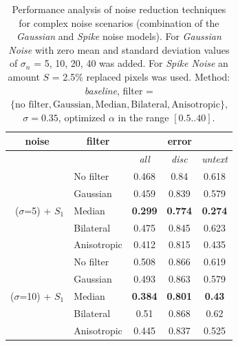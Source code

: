 \begin{table}[ht] \scriptsize
  \centering
  \caption{Performance analysis of noise reduction techniques for complex noise scenarios (combination of the \textit{Gaussian} and \textit{Spike} noise models).  For  \textit{Gaussian Noise} with zero mean and standard deviation values of $\sigma_n$ = 5, 10, 20, 40 was added. For \textit{Spike Noise} an amount $S$ = 2.5\% replaced pixels was used. Method: \textit{baseline}, filter = $\lbrace \text{no filter}, \text{Gaussian}, \text{Median}, \text{Bilateral}, \text{Anisotropic}  \rbrace$, $\sigma=0.35$, optimized $\alpha$ in the range $[0.5 .. 40]$.}
    \begin{tabular}{rrcrr}
    \toprule
    \multicolumn{1}{c}{noise} & \multicolumn{1}{c}{filter} & \multicolumn{3}{c}{error} \\
    \midrule
          &       & \textit{all} & \multicolumn{1}{c}{\textit{disc}} & \multicolumn{1}{c}{\textit{untext}} \\
          \midrule
          \midrule
    \multirow{5}[1]{*}{($\sigma$=5) + $S_1$} & \multicolumn{1}{l}{No filter} & 0.468 & \multicolumn{1}{c}{0.84} & \multicolumn{1}{c}{0.618} \\
          & \multicolumn{1}{l}{Gaussian} & 0.459 & \multicolumn{1}{c}{0.839} & \multicolumn{1}{c}{0.579} \\
          & \multicolumn{1}{l}{Median} & \textbf{0.299} & \multicolumn{1}{c}{\textbf{0.774}} & \multicolumn{1}{c}{\textbf{0.274}} \\
          & \multicolumn{1}{l}{Bilateral} & 0.475 & \multicolumn{1}{c}{0.845} & \multicolumn{1}{c}{0.623} \\
          & \multicolumn{1}{l}{Anisotropic} & 0.412 & \multicolumn{1}{c}{0.815} & \multicolumn{1}{c}{0.435} \\
          \midrule
    \multirow{5}[2]{*}{($\sigma$=10) + $S_1$} & \multicolumn{1}{l}{No filter} & 0.508 & \multicolumn{1}{c}{0.866} & \multicolumn{1}{c}{0.619} \\
          & \multicolumn{1}{l}{Gaussian} & 0.493 & \multicolumn{1}{c}{0.863} & \multicolumn{1}{c}{0.579} \\
          & \multicolumn{1}{l}{Median} & \textbf{0.384} & \multicolumn{1}{c}{\textbf{0.801}} & \multicolumn{1}{c}{\textbf{0.43}} \\
          & \multicolumn{1}{l}{Bilateral} & 0.51  & \multicolumn{1}{c}{0.868} & \multicolumn{1}{c}{0.62} \\
          & \multicolumn{1}{l}{Anisotropic} & 0.445 & \multicolumn{1}{c}{0.837} & \multicolumn{1}{c}{0.525} \\

\end{tabular}
\end{table}
